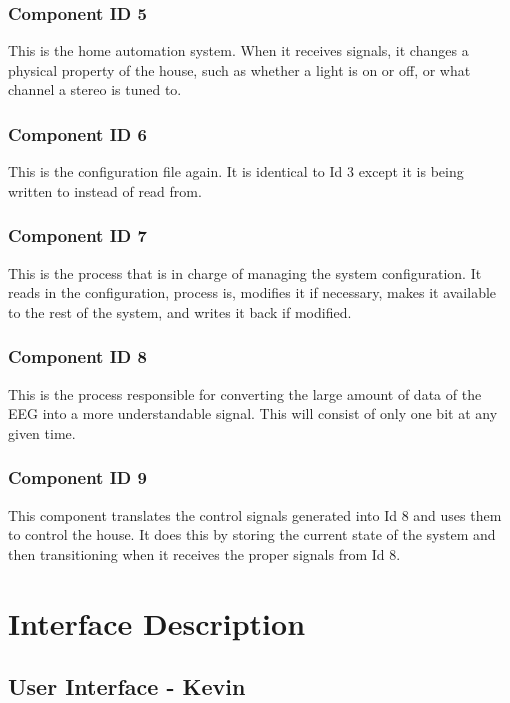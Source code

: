 \documentclass{article}
\begin{document}
\subsubsection{Component ID 5}
This is the home automation system. When it receives signals, it changes a physical property of the house, such as whether a light is on or off, or what channel a stereo is tuned to.

\subsubsection{Component ID 6}
This is the configuration file again. It is identical to Id 3 except it is being written to instead of read from.

\subsubsection{Component ID 7}
This is the process that is in charge of managing the system configuration. It reads in the configuration, process is, modifies it if necessary, makes it available to the rest of the system, and writes it back if modified.

\subsubsection{Component ID 8}
This is the process responsible for converting the large amount of data of the EEG into a more understandable signal. This will consist of only one bit at any given time.

\subsubsection{Component ID 9}
This component translates the control signals generated into Id 8 and uses them to control the house. It does this by storing the current state of the system and then transitioning when it receives the proper signals from Id 8.
\newpage

\section{Interface Description}

\subsection{User Interface - Kevin}
\end{document}
